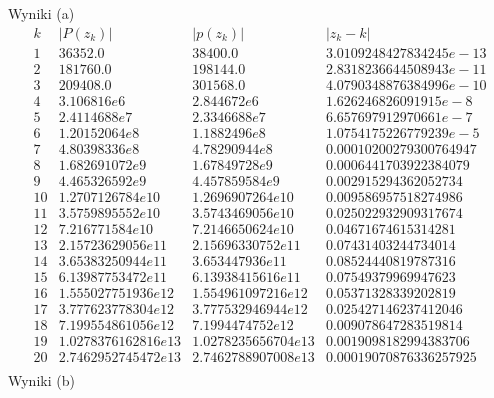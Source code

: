 Wyniki (a)
$$
\begin{array}{c|c|c|c}
k & |P(z_k)| & |p(z_k)| & |z_k - k|\\
\hline
1 & 36352.0 & 38400.0 & 3.0109248427834245e-13\\
2 & 181760.0 & 198144.0 & 2.8318236644508943e-11\\
3 & 209408.0 & 301568.0 & 4.0790348876384996e-10\\
4 & 3.106816e6 & 2.844672e6 & 1.626246826091915e-8\\
5 & 2.4114688e7 & 2.3346688e7 & 6.657697912970661e-7\\
6 & 1.20152064e8 & 1.1882496e8 & 1.0754175226779239e-5\\
7 & 4.80398336e8 & 4.78290944e8 & 0.00010200279300764947\\
8 & 1.682691072e9 & 1.67849728e9 & 0.0006441703922384079\\
9 & 4.465326592e9 & 4.457859584e9 & 0.002915294362052734\\
10 & 1.2707126784e10 & 1.2696907264e10 & 0.009586957518274986\\
11 & 3.5759895552e10 & 3.5743469056e10 & 0.025022932909317674\\
12 & 7.216771584e10 & 7.2146650624e10 & 0.04671674615314281\\
13 & 2.15723629056e11 & 2.15696330752e11 & 0.07431403244734014\\
14 & 3.65383250944e11 & 3.653447936e11 & 0.08524440819787316\\
15 & 6.13987753472e11 & 6.13938415616e11 & 0.07549379969947623\\
16 & 1.555027751936e12 & 1.554961097216e12 & 0.05371328339202819\\
17 & 3.777623778304e12 & 3.777532946944e12 & 0.025427146237412046\\
18 & 7.199554861056e12 & 7.1994474752e12 & 0.009078647283519814\\
19 & 1.0278376162816e13 & 1.0278235656704e13 & 0.0019098182994383706\\
20 & 2.7462952745472e13 & 2.7462788907008e13 & 0.00019070876336257925\\
\end{array}
$$
Wyniki (b)
